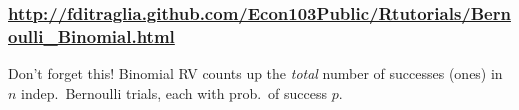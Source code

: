 \documentclass[handout]{beamer}
\begin{document}
\begin{frame}
	\frametitle{\href{http://fditraglia.github.com/Econ103Public/Rtutorials/Bernoulli_Binomial.html}{\small http://fditraglia.github.com/Econ103Public/Rtutorials/Bernoulli\_Binomial.html}}




\begin{figure}
\end{figure}

\begin{alertblock}{Don't forget this!}
 Binomial RV counts up the \emph{total} number of successes (ones) in $n$ indep.\ Bernoulli trials, each with prob.\ of success $p$.
\end{alertblock}

\end{frame}

\end{document}
